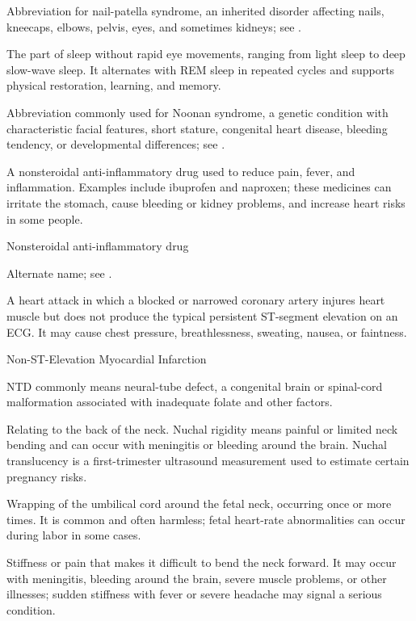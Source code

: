  Abbreviation for nail-patella syndrome, an inherited disorder affecting nails, kneecaps, elbows, pelvis, eyes, and sometimes kidneys; see .

 The part of sleep without rapid eye movements, ranging from light sleep to deep slow-wave sleep. It alternates with REM sleep in repeated cycles and supports physical restoration, learning, and memory.

 Abbreviation commonly used for Noonan syndrome, a genetic condition with characteristic facial features, short stature, congenital heart disease, bleeding tendency, or developmental differences; see .

 A nonsteroidal anti-inflammatory drug used to reduce pain, fever, and inflammation. Examples include ibuprofen and naproxen; these medicines can irritate the stomach, cause bleeding or kidney problems, and increase heart risks in some people.

\synonyms
Nonsteroidal anti-inflammatory drug

 Alternate name; see .

 A heart attack in which a blocked or narrowed coronary artery injures heart muscle but does not produce the typical persistent ST-segment elevation on an ECG. It may cause chest pressure, breathlessness, sweating, nausea, or faintness.

\synonyms
Non-ST-Elevation Myocardial Infarction

 NTD commonly means neural-tube defect, a congenital brain or spinal-cord malformation associated with inadequate folate and other factors.

 Relating to the back of the neck. Nuchal rigidity means painful or limited neck bending and can occur with meningitis or bleeding around the brain. Nuchal translucency is a first-trimester ultrasound measurement used to estimate certain pregnancy risks.

 Wrapping of the umbilical cord around the fetal neck, occurring once or more times. It is common and often harmless; fetal heart-rate abnormalities can occur during labor in some cases.

 Stiffness or pain that makes it difficult to bend the neck forward. It may occur with meningitis, bleeding around the brain, severe muscle problems, or other illnesses; sudden stiffness with fever or severe headache may signal a serious condition.


